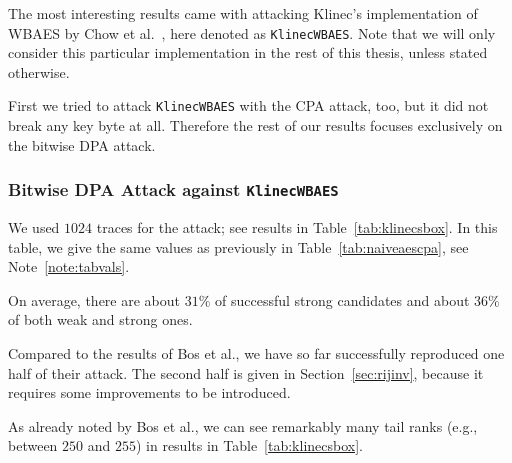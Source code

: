 The most interesting results came with attacking Klinec's implementation \cite{klinec2013implementation} of WBAES by Chow et al.\ \cite{chow2002aes}, here denoted as {\tt KlinecWBAES}. Note that we will only consider this particular implementation in the rest of this thesis, unless stated otherwise.

First we tried to attack {\tt KlinecWBAES} with the CPA attack, too, but it did not break any key byte at all. Therefore the rest of our results focuses exclusively on the bitwise DPA attack.

\subsubsection{Bitwise DPA Attack against {\tt KlinecWBAES}}
	
	We used $1024$ traces for the attack; see results in Table~\ref{tab:klinecsbox}. In this table, we give the same values as previously in Table~\ref{tab:naiveaescpa}, see Note~\ref{note:tabvals}.
	
	
	On average, there are about $31\%$ of successful strong candidates and about $36\%$ of both weak and strong ones.
	
	Compared to the results of Bos et al., we have so far successfully reproduced one half of their attack. The second half is given in Section~\ref{sec:rijinv}, because it requires some improvements to be introduced.
	
	\begin{note}
	\label{note:tailrank}
		As already noted by Bos et al., we can see remarkably many tail ranks (e.g., between $250$ and $255$) in results in Table~\ref{tab:klinecsbox}.
	\end{note}




